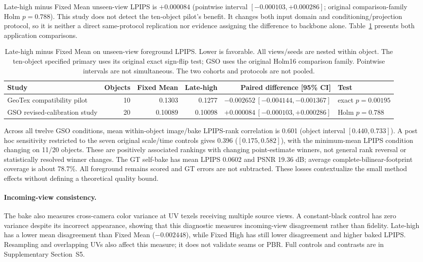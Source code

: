 \documentclass[times,twocolumn,final]{elsarticle}
\begin{document}
Late-high minus Fixed Mean unseen-view LPIPS is $+0.000084$ (pointwise interval $[-0.000103,+0.000286]$; original comparison-family Holm $p=0.788$). This study does not detect the ten-object pilot's benefit. It changes both input domain and conditioning/projection protocol, so it is neither a direct same-protocol replication nor evidence assigning the difference to backbone alone. Table~\ref{tab:bake-cohorts} presents both application comparisons.

\begin{table}[t]\centering\scriptsize\setlength{\tabcolsep}{4pt}
\caption{Late-high minus Fixed Mean on unseen-view foreground LPIPS. Lower is favorable. All views/seeds are nested within object. The ten-object specified primary uses its original exact sign-flip test; GSO uses the original Holm16 comparison family. Pointwise intervals are not simultaneous. The two cohorts and protocols are not pooled.}
\label{tab:bake-cohorts}
\begin{tabular}{lrrrrl}
\toprule Study & Objects & Fixed Mean & Late-high & Paired difference [95\% CI] & Test \\
\midrule
GeoTex compatibility pilot & 10 & 0.1303 & 0.1277 & $-0.002652\ [-0.004144,-0.001367]$ & exact $p=0.00195$ \\
GSO revised-calibration study & 20 & 0.10089 & 0.10098 & $+0.000084\ [-0.000103,+0.000286]$ & Holm $p=0.788$ \\
\bottomrule\end{tabular}\end{table}

Across all twelve GSO conditions, mean within-object image/bake LPIPS-rank correlation is 0.601 (object interval $[0.440,0.733]$). A post hoc sensitivity restricted to the seven original scale/time controls gives 0.396 ($[0.175,0.582]$), with the minimum-mean LPIPS condition changing on 11/20 objects. These are positively associated rankings with changing point-estimate winners, not general rank reversal or statistically resolved winner changes. The GT self-bake has mean LPIPS 0.0602 and PSNR 19.36 dB; average complete-bilinear-footprint coverage is about 78.7\%. All foreground remains scored and GT errors are not subtracted. These losses contextualize the small method effects without defining a theoretical quality bound.

\paragraph{Incoming-view consistency.}
The bake also measures cross-camera color variance at UV texels receiving multiple source views. A constant-black control has zero variance despite its incorrect appearance, showing that this diagnostic measures incoming-view disagreement rather than fidelity. Late-high has a lower mean disagreement than Fixed Mean ($-0.002448$), while Fixed High has still lower disagreement and higher baked LPIPS. Resampling and overlapping UVs also affect this measure; it does not validate seams or PBR. Full controls and contrasts are in Supplementary Section~S5.
\end{document}

